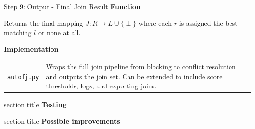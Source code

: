 \documentclass[8pt]{beamer} %
\begin{document}
\begin{frame}{Step 9: Output - Final Join Result}
	\textbf{Function}
	
	Returns the final mapping $J: R \rightarrow L \cup \{\perp\}$ where each $r$ is assigned the best matching $l$ or none at all.
	
	\vspace{2em}
	
	\textbf{Implementation}

	\begin{tabular}{l p{3in}}	
		\texttt{autofj.py} & Wraps the full join pipeline from blocking to conflict resolution and outputs the join set. Can be extended to include score thresholds, logs, and exporting joins.
	\end{tabular}


\end{frame}

\begin{frame}[plain]
	\begin{beamercolorbox}[wd=\paperwidth,ht=0.7\paperheight,dp=2ex,center]{section title}
		\Huge \textbf{Testing}
	\end{beamercolorbox}
\end{frame}


\begin{frame}[plain]
	\begin{beamercolorbox}[wd=\paperwidth,ht=0.7\paperheight,dp=2ex,center]{section title}
		\Huge \textbf{Possible improvements}
	\end{beamercolorbox}
\end{frame}
\end{document}
